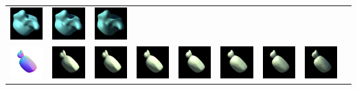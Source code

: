 \begin{center}
\begin{longtable}{@{}c@{}c@{}c@{}c@{}c@{}c@{}c@{}c@{}c@{}}
\includegraphics[width=0.1\linewidth]{training/17_5.png} & \includegraphics[width=0.1\linewidth]{training/17_6.png} &
\includegraphics[width=0.1\linewidth]{training/17_7.png} \\
\includegraphics[width=0.1\linewidth]{training/18_gt.png} & \includegraphics[width=0.1\linewidth]{training/18_0.png} &
\includegraphics[width=0.1\linewidth]{training/18_1.png} & \includegraphics[width=0.1\linewidth]{training/18_2.png} &
\includegraphics[width=0.1\linewidth]{training/18_3.png} & \includegraphics[width=0.1\linewidth]{training/18_4.png} &
\includegraphics[width=0.1\linewidth]{training/18_5.png} & \includegraphics[width=0.1\linewidth]{training/18_6.png} &

\end{longtable}
\end{center}
